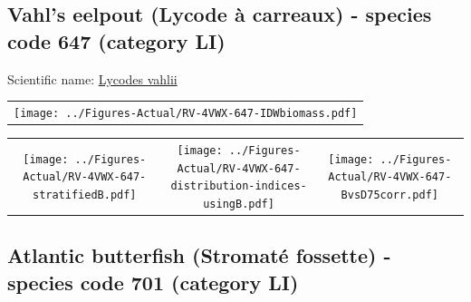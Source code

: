 \documentclass[12pt]{article}\usepackage[]{graphicx}\usepackage[]{color}
\begin{document}
\renewcommand\thefigure{\thesubsection\Alph{figure}}

\setcounter{figure}{0}

\hypertarget{sec:647}{%
\subsection{Vahl's eelpout (Lycode à carreaux) - species code 647 (category LI)}\label{sec:647}}

  


Scientific name: \href{http://www.marinespecies.org/aphia.php?p=taxdetails\&id=127118}{Lycodes vahlii} \newline
\begin{minipage}{1.0\textwidth}
 \begin{tabular}{c}
\texttt{[image: ../Figures-Actual/RV-4VWX-647-IDWbiomass.pdf]} \\ 
\end{tabular} 
\end{minipage}
\newline

\vspace{1cm}
\begin{minipage}{1.0\textwidth}
 \begin{tabular}{ccc}
\texttt{[image: ../Figures-Actual/RV-4VWX-647-stratifiedB.pdf]} & 
\texttt{[image: ../Figures-Actual/RV-4VWX-647-distribution-indices-usingB.pdf]} & 
\texttt{[image: ../Figures-Actual/RV-4VWX-647-BvsD75corr.pdf]} \\ 
\end{tabular} 
\end{minipage}
\clearpage

\renewcommand\thefigure{\thesubsection\Alph{figure}}

\setcounter{figure}{0}

\hypertarget{sec:701}{%
\subsection{Atlantic butterfish (Stromaté fossette) - species code 701 (category LI)}\label{sec:701}}

  
\end{document}
